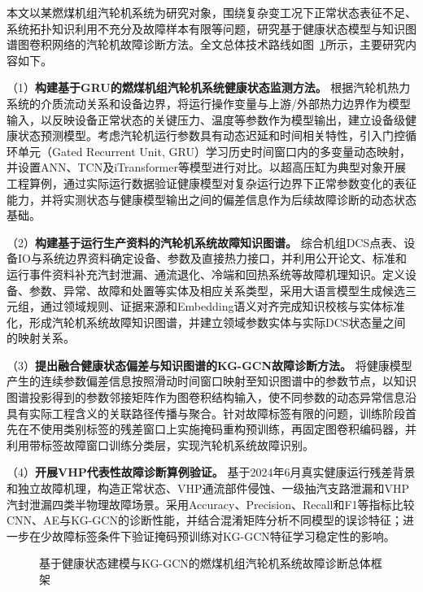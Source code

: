 本文以某燃煤机组汽轮机系统为研究对象，围绕复杂变工况下正常状态表征不足、系统拓扑知识利用不充分及故障样本有限等问题，研究基于健康状态模型与知识图谱图卷积网络的汽轮机故障诊断方法。全文总体技术路线如图~\ref{fig:overall_framework}所示，主要研究内容如下。

（1）\textbf{构建基于GRU的燃煤机组汽轮机系统健康状态监测方法。} 根据汽轮机热力系统的介质流动关系和设备边界，将运行操作变量与上游/外部热力边界作为模型输入，以反映设备正常状态的关键压力、温度等参数作为模型输出，建立设备级健康状态预测模型。考虑汽轮机运行参数具有动态迟延和时间相关特性，引入门控循环单元（Gated Recurrent Unit, GRU）学习历史时间窗口内的多变量动态映射，并设置ANN、TCN及iTransformer等模型进行对比。以超高压缸为典型对象开展工程算例，通过实际运行数据验证健康模型对复杂运行边界下正常参数变化的表征能力，并将实测状态与健康模型输出之间的偏差信息作为后续故障诊断的动态状态基础。

（2）\textbf{构建基于运行生产资料的汽轮机系统故障知识图谱。} 综合机组DCS点表、设备IO与系统边界资料确定设备、参数及直接热力接口，并利用公开论文、标准和运行事件资料补充汽封泄漏、通流退化、冷端和回热系统等故障机理知识。定义设备、参数、异常、故障和处置等实体及相应关系类型，采用大语言模型生成候选三元组，通过领域规则、证据来源和Embedding语义对齐完成知识校核与实体标准化，形成汽轮机系统故障知识图谱，并建立领域参数实体与实际DCS状态量之间的映射关系。

（3）\textbf{提出融合健康状态偏差与知识图谱的KG-GCN故障诊断方法。} 将健康模型产生的连续参数偏差信息按照滑动时间窗口映射至知识图谱中的参数节点，以知识图谱投影得到的参数邻接矩阵作为图卷积结构输入，使不同参数的动态异常信息沿具有实际工程含义的关联路径传播与聚合。针对故障标签有限的问题，训练阶段首先在不使用类别标签的残差窗口上实施掩码重构预训练，再固定图卷积编码器，并利用带标签故障窗口训练分类层，实现汽轮机系统故障识别。

（4）\textbf{开展VHP代表性故障诊断算例验证。} 基于2024年6月真实健康运行残差背景和独立故障机理，构造正常状态、VHP通流部件侵蚀、一级抽汽支路泄漏和VHP汽封泄漏四类半物理故障场景。采用Accuracy、Precision、Recall和F1等指标比较CNN、AE与KG-GCN的诊断性能，并结合混淆矩阵分析不同模型的误诊特征；进一步在少故障标签条件下验证掩码预训练对KG-GCN特征学习稳定性的影响。

\begin{figure}[htbp]
    \centering
    \caption{基于健康状态建模与KG-GCN的燃煤机组汽轮机系统故障诊断总体框架}
    \label{fig:overall_framework}
\end{figure}
